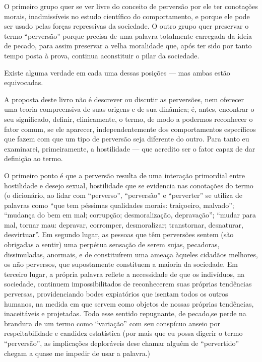 O primeiro grupo quer se ver livre do conceito de perversão por ele
ter conotações morais,\idxpervconot{} inadmissíveis no estudo científico do
comportamento, e porque ele pode ser usado pelas forças repressivas da
sociedade. O outro grupo quer preservar o termo
``perversão'' porque precisa de uma palavra
totalmente carregada da ideia de pecado,\idxpervpecad{} para assim preservar a velha
moralidade que, após ter sido por tanto tempo posta à prova, continua a\idxpervaspec[|)]
constituir o pilar da sociedade.

Existe alguma verdade em cada uma dessas posições --- mas ambas estão
equivocadas.

A proposta deste livro não é descrever ou discutir as perversões,
nem oferecer uma teoria compreensiva de suas origens e de sua dinâmica;
é, antes, encontrar o seu significado, definir, clinicamente, o termo,
de modo a podermos reconhecer o fator comum, se ele aparecer,
independentemente dos comportamentos específicos que fazem com que um
tipo de perversão seja diferente do outro. Para tanto eu examinarei,
primeiramente, a hostilidade\idxhost{} --- que acredito ser o fator capaz de dar
definição ao termo.

O primeiro ponto é que a perversão resulta de uma interação
primordial entre hostilidade e desejo sexual, hostilidade que se
evidencia nas conotações do termo\idxpervconot{} (o dicionário, ao lidar com
``perverso'', ``perversão'' e ``perverter'' se utiliza de palavras como
``que tem péssimas qualidades morais: traiçoeiro, malvado''; ``mudança do bem em mal;
corrupção; desmoralização, depravação''; ``mudar para mal, tornar mau: depravar, corromper,
desmoralizar; transtornar, desnaturar, desvirtuar''.
Em segundo lugar, as pessoas que têm perversões sentem (são
obrigadas a sentir) uma perpétua sensação de serem sujas, pecadoras,\idxpervpecad{} 
 dissimuladas, anormais, e de constituírem uma ameaça àqueles cidadãos
melhores, os não perversos, que supostamente constituem a maioria da
sociedade. Em terceiro lugar, a própria palavra reflete a necessidade
de que os indivíduos, na sociedade, continuem impossibilitados de
reconhecerem suas próprias tendências perversas, providenciando bodes
expiatórios\idxbodex{} que isentam todos os outros humanos, na medida em que
servem como objetos de nossas próprias tendências, inaceitáveis e
projetadas. Todo esse sentido repugnante, de pecado,\idxpecad[|)] se perde na
brandura de um termo como ``variação''\idxvaria{} com
seu conspícuo anseio por respeitabilidade e candidez estatística (por
mais que eu possa digerir o termo
``perversão'', as implicações deploráveis de\idxaspec[|)]
se chamar alguém de ``pervertido'' chegam a
quase me impedir de usar a palavra.)


